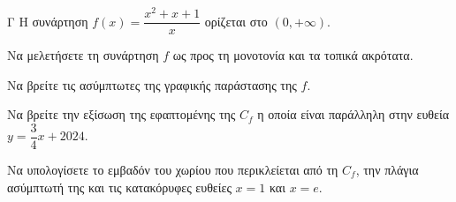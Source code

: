 \begin{thema}{Γ}
Η συνάρτηση $f(x) = \dfrac{x^2+x+1}{x}$ ορίζεται στο $(0, +\infty)$.
\begin{erwthma}
  \item Να μελετήσετε τη συνάρτηση $f$ ως προς τη μονοτονία και τα τοπικά ακρότατα.
  \item Να βρείτε τις ασύμπτωτες της γραφικής παράστασης της $f$.
  \item Να βρείτε την εξίσωση της εφαπτομένης της $C_f$ η οποία είναι παράλληλη στην ευθεία $y = \dfrac{3}{4}x + 2024$.
  \item Να υπολογίσετε το εμβαδόν του χωρίου που περικλείεται από τη $C_f$, την πλάγια ασύμπτωτή της και τις κατακόρυφες ευθείες $x=1$ και $x=e$.
\end{erwthma}
\end{thema}
